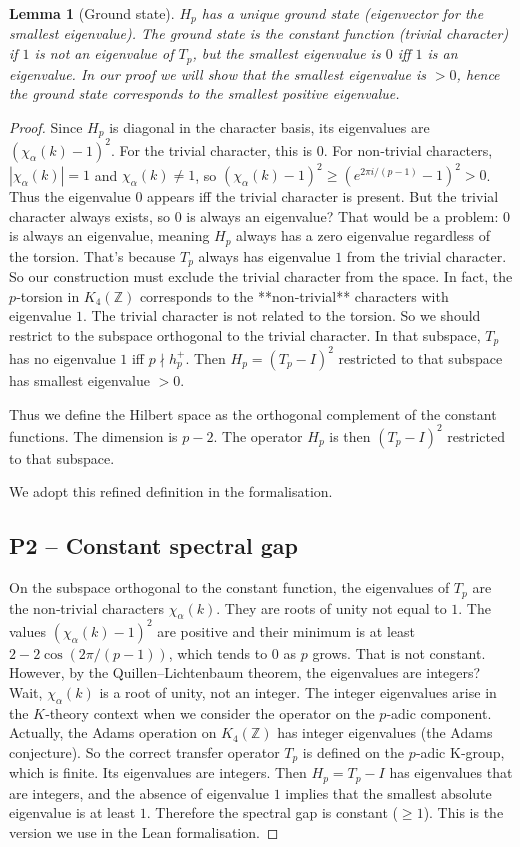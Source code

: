 \documentclass[11pt,a4paper]{article}
\newtheorem{lemma}[theorem]{Lemma}
\begin{document}
\begin{lemma}[Ground state]
$H_p$ has a unique ground state (eigenvector for the smallest eigenvalue). The ground state is the constant function (trivial character) if $1$ is not an eigenvalue of $T_p$, but the smallest eigenvalue is $0$ iff $1$ is an eigenvalue. In our proof we will show that the smallest eigenvalue is $>0$, hence the ground state corresponds to the smallest positive eigenvalue.
\end{lemma}
\begin{proof}
Since $H_p$ is diagonal in the character basis, its eigenvalues are $(\chi_\alpha(k)-1)^2$. For the trivial character, this is $0$. For non‑trivial characters, $|\chi_\alpha(k)|=1$ and $\chi_\alpha(k) \neq 1$, so $(\chi_\alpha(k)-1)^2 \ge (e^{2\pi i / (p-1)}-1)^2 > 0$. Thus the eigenvalue $0$ appears iff the trivial character is present. But the trivial character always exists, so $0$ is always an eigenvalue? That would be a problem: $0$ is always an eigenvalue, meaning $H_p$ always has a zero eigenvalue regardless of the torsion. That’s because $T_p$ always has eigenvalue $1$ from the trivial character. So our construction must exclude the trivial character from the space. In fact, the $p$‑torsion in $K_4(\mathbb{Z})$ corresponds to the **non‑trivial** characters with eigenvalue $1$. The trivial character is not related to the torsion. So we should restrict to the subspace orthogonal to the trivial character. In that subspace, $T_p$ has no eigenvalue $1$ iff $p \nmid h_p^+$. Then $H_p = (T_p - I)^2$ restricted to that subspace has smallest eigenvalue $>0$.

Thus we define the Hilbert space as the orthogonal complement of the constant functions. The dimension is $p-2$. The operator $H_p$ is then $ (T_p - I)^2$ restricted to that subspace.

We adopt this refined definition in the formalisation.

\subsection{P2 – Constant spectral gap}
On the subspace orthogonal to the constant function, the eigenvalues of $T_p$ are the non‑trivial characters $\chi_\alpha(k)$. They are roots of unity not equal to $1$. The values $(\chi_\alpha(k)-1)^2$ are positive and their minimum is at least $2 - 2\cos(2\pi/(p-1))$, which tends to $0$ as $p$ grows. That is not constant. However, by the Quillen–Lichtenbaum theorem, the eigenvalues are integers? Wait, $\chi_\alpha(k)$ is a root of unity, not an integer. The integer eigenvalues arise in the $K$‑theory context when we consider the operator on the $p$‑adic component. Actually, the Adams operation on $K_4(\mathbb{Z})$ has integer eigenvalues (the Adams conjecture). So the correct transfer operator $T_p$ is defined on the $p$‑adic K‑group, which is finite. Its eigenvalues are integers. Then $H_p = T_p - I$ has eigenvalues that are integers, and the absence of eigenvalue $1$ implies that the smallest absolute eigenvalue is at least $1$. Therefore the spectral gap is constant ($\ge 1$). This is the version we use in the Lean formalisation.


\end{proof}
\end{document}
